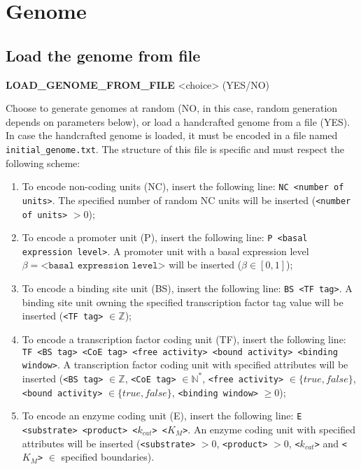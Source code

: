 
\section{Genome}

\subsection{Load the genome from file}
\begin{center}
{\bf LOAD\_GENOME\_FROM\_FILE} <choice> (YES/NO)
\end{center}
Choose to generate genomes at random (NO, in this case, random generation depends on parameters below), or load a handcrafted genome from a file (YES). In case the handcrafted genome is loaded, it must be encoded in a file named \texttt{initial\_genome.txt}. The structure of this file is specific and must respect the following scheme:
\begin{enumerate}
\item To encode non-coding units (NC), insert the following line: \texttt{NC <number of units>}. The specified number of random NC units will be inserted (\texttt{<number of units>} $> 0$);
\item To encode a promoter unit (P), insert the following line: \texttt{P <basal expression level>}. A promoter unit with a basal expression level $\beta=\texttt{<basal expression level>}$ will be inserted ($\beta \in [0,1]$);
\item To encode a binding site unit (BS), insert the following line: \texttt{BS <TF tag>}. A binding site unit owning the specified transcription factor tag value will be inserted (\texttt{<TF tag>} $\in \mathbb{Z}$);
\item To encode a transcription factor coding unit (TF), insert the following line: \texttt{TF <BS tag> <CoE tag> <free activity> <bound activity> <binding window>}. A transcription factor coding unit with specified attributes will be inserted (\texttt{<BS tag>} $\in \mathbb{Z}$, \texttt{<CoE tag>} $\in \mathbb{N}^*$, \texttt{<free activity>} $\in \{true, false\}$, \texttt{<bound activity>} $\in \{true, false\}$, \texttt{<binding window>} $\ge 0$);
\item To encode an enzyme coding unit (E), insert the following line: \texttt{E <substrate> <product> <$k_{cat}$> <$K_M$>}. An enzyme coding unit with specified attributes will be inserted (\texttt{<substrate>} $> 0$, \texttt{<product>} $> 0$, \texttt{<$k_{cat}$>} and \texttt{<$K_M$>} $\in$ specified boundaries).
\end{enumerate}

